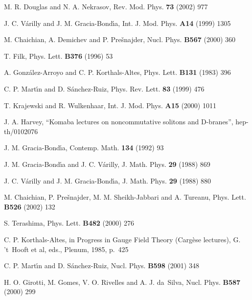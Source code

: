 \documentclass[a4paper,12pt]{article}
\newcommand{\1}{\mathbf{1}}         %
\newcommand{\7}{\dagger}            %
\newcommand{\8}{\bullet}            %
\renewcommand{\.}{\cdot}            %
\renewcommand{\:}{\colon}           %
\begin{document}
\begin{thebibliography}{92}
M. R. Douglas and N. A. Nekrasov,
Rev. Mod. Phys. {\bf 73} (2002) 977

J. C. V\'arilly and J. M. Gracia-Bond\'{\i}a,
Int. J. Mod. Phys. {\bf A14} (1999) 1305

M. Chaichian, A. Demichev and P. Pre\v{s}najder,
Nucl. Phys. {\bf B567} (2000) 360

T. Filk,
Phys. Lett. {\bf B376} (1996) 53

A. Gonz\'alez-Arroyo and C. P. Korthals-Altes,
Phys. Lett. {\bf B131} (1983) 396

C. P. Mart\'{\i}n and D. S\'anchez-Ruiz,
Phys. Rev. Lett. {\bf 83} (1999) 476

T. Krajewski and R. Wulkenhaar,
Int. J. Mod. Phys. {\bf A15} (2000) 1011

J. A. Harvey,
``Komaba lectures on noncommutative solitons and D-branes'',
hep-th/0102076

J. M. Gracia-Bond\'{\i}a,
Contemp. Math. {\bf 134} (1992) 93

J. M. Gracia-Bond{\'\i}a and J. C. V\'arilly,
J. Math. Phys. {\bf 29} (1988) 869

J. C. V\'arilly and J. M. Gracia-Bond{\'\i}a,
J. Math. Phys. {\bf 29} (1988) 880

M. Chaichian, P. Pre\v{s}najder, M. M. Sheikh-Jabbari and A. Tureanu,
Phys. Lett. {\bf B526} (2002) 132

S. Terashima,
Phys. Lett. {\bf B482} (2000) 276

C. P. Korthals-Altes,
in Progress in Gauge Field Theory (Carg\`ese lectures),
G. 't~Hooft et al, eds., Plenum, 1985, p.~425

C. P. Mart\'{\i}n and D. S\'anchez-Ruiz,
Nucl. Phys. {\bf B598} (2001) 348

H. O. Girotti, M. Gomes, V. O. Rivelles and A. J. da~Silva,
Nucl. Phys. {\bf B587} (2000) 299


\end{thebibliography}
\end{document}
